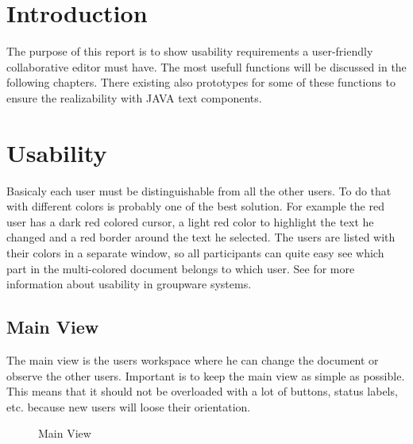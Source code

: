\documentclass[11pt,a4paper]{article}
\begin{document}
\setlength{\parindent}{0pt}

\newtheorem{defn}{Definition}




\newpage

\tableofcontents
\newpage
\listoftables
\listoffigures
\newpage



\section{Introduction}
The purpose of this report is to show usability requirements a user-friendly collaborative editor must have. The most usefull functions will be discussed in the following chapters. There existing also prototypes for some of these functions to ensure the realizability with JAVA text components.

\section{Usability}
Basicaly each user must be distinguishable from all the other users. To do that with different colors is probably one of the best solution. For example the red user has a dark red colored cursor, a light red color to highlight the text he changed and a red border around the text he selected. The users are listed with their colors in a separate window, so all participants can quite easy see which part in the multi-colored document belongs to which user. See \cite{usability} for more information about usability in groupware systems.

\subsection{Main View}
The main view is the users workspace where he can change the document or observe the other users. Important is to keep the main view as simple as possible. This means that it should not be overloaded with a lot of buttons, status labels, etc. because new users will loose their orientation.
\begin{figure}[H]
\centering
{}
\caption{Main View}
\end{figure}
\end{document}
